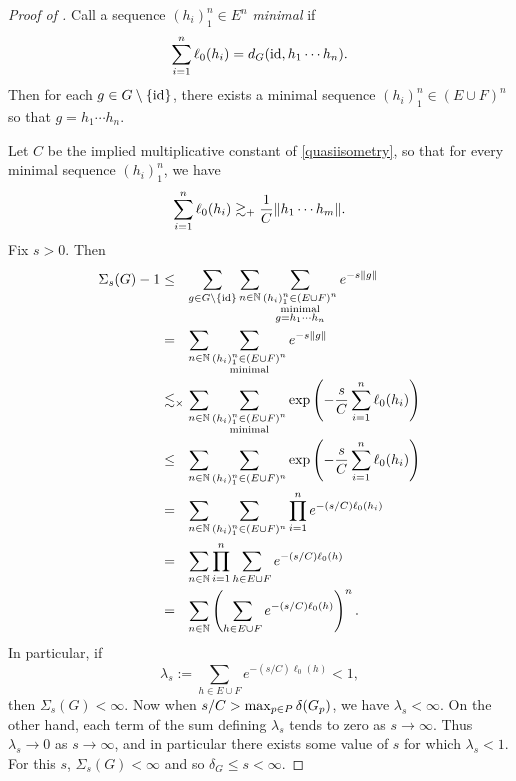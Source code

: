 \begin{proof}[Proof of ]
Call a sequence $(h_i)_1^n\in E^n$ \emph{minimal} if
\begin{equation}
\label{quasiisometry}
\sum_{i = 1}^n \ell_0(h_i) = d_G(\mathrm{id},h_1\cdots h_n).
\end{equation}
Then for each $g\in G\setminus\{\mathrm{id}\}$, there exists a minimal sequence $(h_i)_1^n\in (E\cup F)^n$ so that $g = h_1\cdots h_n$.

Let $C$ be the implied multiplicative constant of \eqref{quasiisometry}, so that for every minimal sequence $(h_i)_1^n$, we have
\[
\sum_{i = 1}^n \ell_0(h_i) \gtrsim_+ \frac1C \|h_1\cdots h_m\|.
\]
Fix $s > 0$. Then
\begin{align*}
\Sigma_s(G) - 1 &\leq_\pt \sum_{g\in G\butnot\{\id\}}\sum_{n\in\N}\sum_{\substack{(h_i)_1^n\in (E\cup F)^n \\ \text{minimal} \\ g = h_1\cdots h_n}} e^{-s\dogo g}\\
&=_\pt \sum_{n\in\N}\sum_{\substack{(h_i)_1^n\in (E\cup F)^n \\ \text{minimal}}} e^{-s\dogo g}\\
&\lesssim_\times \sum_{n\in\N}\sum_{\substack{(h_i)_1^n\in (E\cup F)^n \\ \text{minimal}}} \exp\left(-\frac sC\sum_{i = 1}^n \ell_0(h_i)\right)\\
&\leq_\pt \sum_{n\in\N}\sum_{(h_i)_1^n\in (E\cup F)^n} \exp\left(-\frac sC\sum_{i = 1}^n \ell_0(h_i)\right)\\
&=_\pt \sum_{n\in\N}\sum_{(h_i)_1^n\in (E\cup F)^n}\prod_{i = 1}^n e^{-(s/C)\ell_0(h_i)}\\
&=_\pt \sum_{n\in\N}\prod_{i = 1}^n \sum_{h\in E\cup F} e^{-(s/C)\ell_0(h)}\\
&=_\pt \sum_{n\in\N}\left(\sum_{h\in E\cup F} e^{-(s/C)\ell_0(h)}\right)^n.
\end{align*}
In particular, if
\[
\lambda_s := \sum_{h\in E\cup F} e^{-(s/C)\ell_0(h)} < 1,
\]
then $\Sigma_s(G) < \infty$. Now when $s/C > \max_{p\in P}\delta(G_p)$, we have $\lambda_s < \infty$. On the other hand, each term of the sum defining $\lambda_s$ tends to zero as $s\to\infty$. Thus $\lambda_s\to 0$ as $s\to \infty$, and in particular there exists some value of $s$ for which $\lambda_s < 1$. For this $s$, $\Sigma_s(G) < \infty$ and so $\delta_G \leq s < \infty$.
\end{proof}




\bigskip
